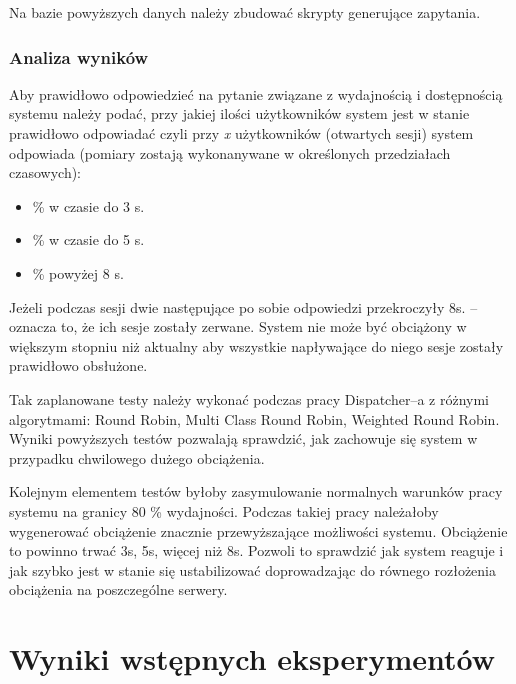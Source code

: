 Na bazie powyższych danych należy zbudować skrypty generujące zapytania.

\subsubsection{Analiza wyników}

Aby prawidłowo odpowiedzieć na pytanie związane z wydajnością i dostępnością systemu należy podać, 
przy jakiej ilości użytkowników system jest w stanie prawidłowo odpowiadać czyli
przy \emph{x} użytkowników (otwartych sesji) system odpowiada (pomiary zostają wykonanywane w określonych przedziałach 
czasowych):
\begin{itemize}
\item \% w czasie do 3 s.
\item \% w czasie do 5 s.
\item \% powyżej 8 s.
\end{itemize}

Jeżeli podczas sesji dwie następujące po sobie odpowiedzi przekroczyły 8s. -- oznacza to, że ich sesje zostały zerwane.
System nie może być obciążony w większym stopniu niż aktualny aby wszystkie napływające do niego sesje zostały 
prawidłowo obsłużone.

Tak zaplanowane testy należy wykonać podczas pracy Dispatcher--a z różnymi algorytmami: Round Robin, Multi Class Round Robin,
Weighted Round Robin. Wyniki powyższych testów pozwalają sprawdzić, jak zachowuje się system w przypadku chwilowego dużego 
obciążenia. 

Kolejnym elementem testów byłoby zasymulowanie normalnych warunków pracy systemu na granicy 80 \% wydajności. Podczas takiej 
pracy należałoby wygenerować obciążenie znacznie przewyższające możliwości systemu. Obciążenie to powinno trwać 3s, 5s, więcej 
niż 8s. Pozwoli to sprawdzić jak system reaguje i jak szybko jest w stanie się ustabilizować doprowadzając do równego 
rozłożenia obciążenia na poszczególne serwery. 
\section{Wyniki wstępnych eksperymentów}

